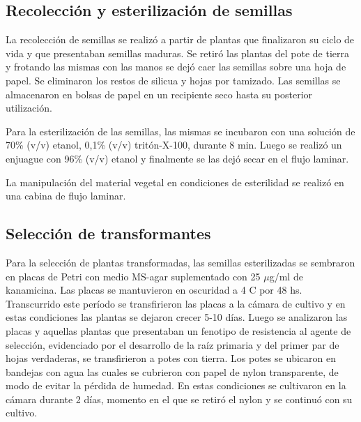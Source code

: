 \subsection{Recolección y esterilización de semillas}

La recolección de semillas se realizó a partir de plantas que finalizaron su ciclo de vida y que presentaban semillas maduras.
Se retiró las plantas del pote de tierra y frotando las mismas con las manos se dejó caer las semillas sobre una hoja de papel.
Se eliminaron los restos de silicua y hojas por tamizado. Las semillas se almacenaron en bolsas de papel en un recipiente seco hasta su posterior utilización.

Para la esterilización de las semillas, las mismas se incubaron con una solución de 70\% (v/v) etanol, 0,1\% (v/v) tritón-X-100, durante 8 min. 
Luego se realizó un enjuague con 96\% (v/v) etanol y finalmente se las dejó secar en el flujo laminar.

La manipulación del material vegetal en condiciones de esterilidad se realizó en una cabina de flujo laminar.

\subsection{Selección de transformantes}
Para la selección de plantas transformadas, las semillas esterilizadas se sembraron en placas de Petri con medio MS-agar suplementado con 25 $\mu$g/ml de kanamicina.
Las placas se mantuvieron en oscuridad a 4 \degree C por 48 hs. Transcurrido este período se transfirieron las placas a la cámara de cultivo y en estas condiciones las plantas se dejaron crecer 5-10 días.
Luego se analizaron las placas y aquellas plantas que presentaban un fenotipo de resistencia al agente de selección, evidenciado por el desarrollo de la raíz primaria y del primer par de hojas verdaderas, se transfirieron a potes con tierra. Los potes se ubicaron en bandejas con agua las cuales se cubrieron con papel de nylon transparente, de modo de evitar la pérdida de humedad.
En estas condiciones se cultivaron en la cámara durante 2 días, momento en el que se retiró el nylon y se continuó con su cultivo.

